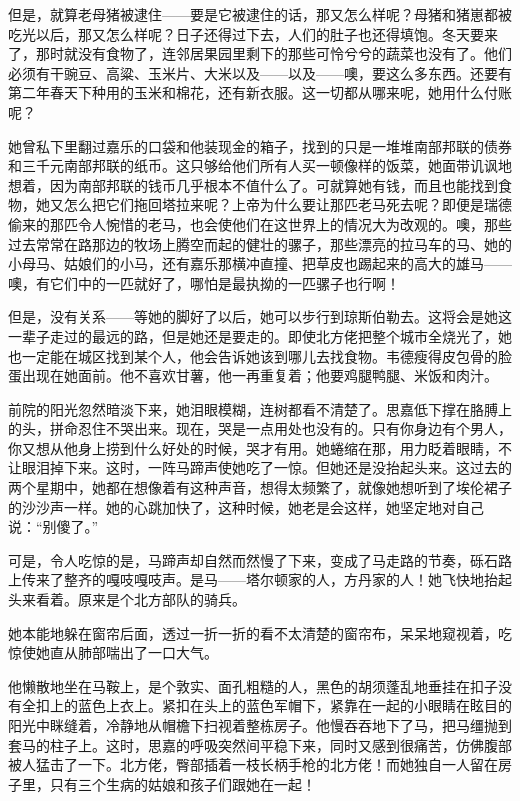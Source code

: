 \par 但是，就算老母猪被逮住——要是它被逮住的话，那又怎么样呢？母猪和猪崽都被吃光以后，那又怎么样呢？日子还得过下去，人们的肚子也还得填饱。冬天要来了，那时就没有食物了，连邻居果园里剩下的那些可怜兮兮的蔬菜也没有了。他们必须有干豌豆、高粱、玉米片、大米以及——以及——噢，要这么多东西。还要有第二年春天下种用的玉米和棉花，还有新衣服。这一切都从哪来呢，她用什么付账呢？
\par 她曾私下里翻过嘉乐的口袋和他装现金的箱子，找到的只是一堆堆南部邦联的债券和三千元南部邦联的纸币。这只够给他们所有人买一顿像样的饭菜，她面带讥讽地想着，因为南部邦联的钱币几乎根本不值什么了。可就算她有钱，而且也能找到食物，她又怎么把它们拖回塔拉来呢？上帝为什么要让那匹老马死去呢？即便是瑞德偷来的那匹令人惋惜的老马，也会使他们在这世界上的情况大为改观的。噢，那些过去常常在路那边的牧场上腾空而起的健壮的骡子，那些漂亮的拉马车的马、她的小母马、姑娘们的小马，还有嘉乐那横冲直撞、把草皮也踢起来的高大的雄马——噢，有它们中的一匹就好了，哪怕是最执拗的一匹骡子也行啊！
\par 但是，没有关系——等她的脚好了以后，她可以步行到琼斯伯勒去。这将会是她这一辈子走过的最远的路，但是她还是要走的。即使北方佬把整个城市全烧光了，她也一定能在城区找到某个人，他会告诉她该到哪儿去找食物。韦德瘦得皮包骨的脸蛋出现在她面前。他不喜欢甘薯，他一再重复着；他要鸡腿鸭腿、米饭和肉汁。
\par 前院的阳光忽然暗淡下来，她泪眼模糊，连树都看不清楚了。思嘉低下撑在胳膊上的头，拼命忍住不哭出来。现在，哭是一点用处也没有的。只有你身边有个男人，你又想从他身上捞到什么好处的时候，哭才有用。她蜷缩在那，用力眨着眼睛，不让眼泪掉下来。这时，一阵马蹄声使她吃了一惊。但她还是没抬起头来。这过去的两个星期中，她都在想像着有这种声音，想得太频繁了，就像她想听到了埃伦裙子的沙沙声一样。她的心跳加快了，这种时候，她老是会这样，她坚定地对自己说：“别傻了。”
\par 可是，令人吃惊的是，马蹄声却自然而然慢了下来，变成了马走路的节奏，砾石路上传来了整齐的嘎吱嘎吱声。是马——塔尔顿家的人，方丹家的人！她飞快地抬起头来看着。原来是个北方部队的骑兵。
\par 她本能地躲在窗帘后面，透过一折一折的看不太清楚的窗帘布，呆呆地窥视着，吃惊使她直从肺部喘出了一口大气。
\par 他懒散地坐在马鞍上，是个敦实、面孔粗糙的人，黑色的胡须蓬乱地垂挂在扣子没有全扣上的蓝色上衣上。紧扣在头上的蓝色军帽下，紧靠在一起的小眼睛在眩目的阳光中眯缝着，冷静地从帽檐下扫视着整栋房子。他慢吞吞地下了马，把马缰抛到套马的柱子上。这时，思嘉的呼吸突然间平稳下来，同时又感到很痛苦，仿佛腹部被人猛击了一下。北方佬，臀部插着一枝长柄手枪的北方佬！而她独自一人留在房子里，只有三个生病的姑娘和孩子们跟她在一起！
